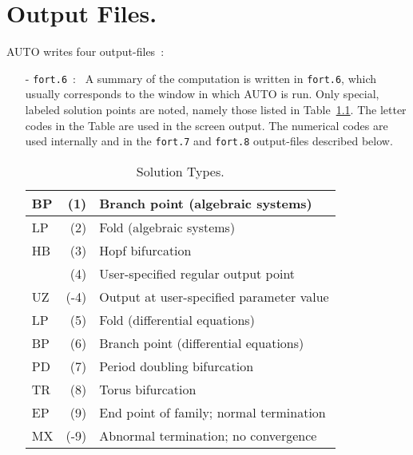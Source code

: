 \documentclass[12pt]{report}
\begin{document}
\chapter{ Output Files.} \label{ch:Output_files}
{\cal AUTO} writes four output-files~:
\begin{itemize}
\item[-] {\tt fort.6}~:~
  A summary of the computation is written in {\tt fort.6}, which usually
  corresponds to the window in which {\cal AUTO} is run. 
  Only special, labeled solution points are noted, namely those listed
  in Table~\ref{tbl:Solution_Types}.
  The letter codes in the Table are used in the screen output.
  The numerical codes are used internally and in
  the {\tt fort.7} and {\tt fort.8} output-files described below.

\begin{table}[htbp]
\begin{center}
\begin{tabular}{| l | r | l |}
\hline
 BP & (1)  & Branch point (algebraic systems) \\
\hline
 LP & (2)  & Fold (algebraic systems) \\
\hline
 HB & (3)  & Hopf bifurcation \\
\hline
  & (4)  & User-specified regular output point \\
\hline
 UZ & (-4)  & Output at user-specified parameter value \\
\hline
 LP & (5)  & Fold (differential equations) \\
\hline
 BP & (6)  & Branch point (differential equations) \\
\hline
 PD & (7)  & Period doubling bifurcation \\
\hline
 TR & (8)  & Torus bifurcation \\
\hline
 EP & (9)  & End point of family; normal termination \\
\hline
 MX & (-9)  & Abnormal termination; no convergence \\
\hline
\end{tabular}
\caption{Solution Types.}
\label{tbl:Solution_Types}
\end{center}
\end{table}
 


\end{itemize}
\end{document}
